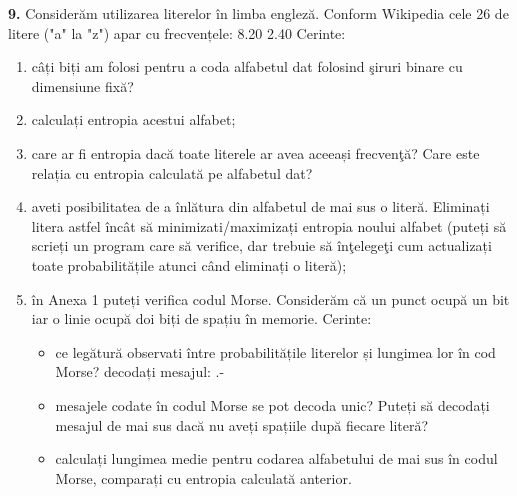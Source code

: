 \documentclass[a4paper]{article}
\begin{document}
\textbf{9.} Considerăm utilizarea literelor în limba engleză. Conform Wikipedia cele 26 de litere ("a" la "z")
apar cu frecvențele: 8.20%
2.40%
Cerinte:
\begin{enumerate}[label=(\alph*)]
    \item câți biți am folosi pentru a coda alfabetul dat folosind şiruri binare cu dimensiune fixă?
    \item calculați entropia acestui alfabet;
    \item care ar fi entropia dacă toate literele ar avea aceeași frecvenţă?
Care este relația cu entropia
calculată pe alfabetul dat?
    \item aveti posibilitatea de a înlătura din alfabetul de mai sus o literă.
Eliminați litera astfel încât să
minimizati/maximizați entropia noului alfabet (puteți să scrieți un program care să verifice,
dar trebuie să înţelegeţi cum actualizați toate probabilitățile atunci când eliminați o literă);
    \item în Anexa 1 puteți verifica codul Morse. Considerăm că un punct ocupă un bit iar o linie
ocupă doi biți de spațiu în memorie.
Cerinte:
    \begin{itemize}
        \item ce legătură observati între probabilitățile literelor și lungimea lor în cod Morse?
decodați mesajul: .-
        \item mesajele codate în codul Morse se pot decoda unic?
Puteți să decodați mesajul de mai
sus dacă nu aveți spațiile după fiecare literă?
        \item calculați lungimea medie pentru codarea alfabetului de mai sus în codul Morse, comparați
cu entropia calculată anterior.
    \end{itemize}
\end{enumerate}
\end{document}
